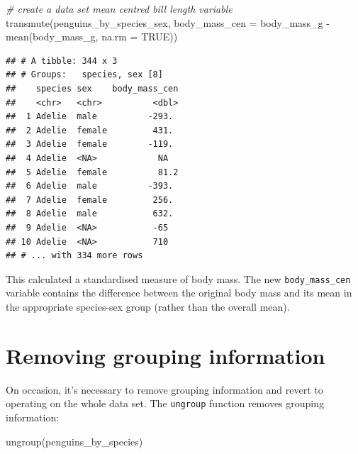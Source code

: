 \documentclass[
]{book}
\newenvironment{Shaded}{\begin{snugshade}}{\end{snugshade}}
\newcommand{\AttributeTok}[1]{\textcolor[rgb]{0.77,0.63,0.00}{#1}}
\newcommand{\CommentTok}[1]{\textcolor[rgb]{0.56,0.35,0.01}{\textit{#1}}}
\newcommand{\ConstantTok}[1]{\textcolor[rgb]{0.00,0.00,0.00}{#1}}
\newcommand{\FunctionTok}[1]{\textcolor[rgb]{0.00,0.00,0.00}{#1}}
\newcommand{\NormalTok}[1]{#1}
\newcommand{\SpecialCharTok}[1]{\textcolor[rgb]{0.00,0.00,0.00}{#1}}
\begin{document}
\begin{Shaded}
\begin{Highlighting}[]
\CommentTok{\# create a data set \textquotesingle{}mean centred\textquotesingle{} bill length variable}
\FunctionTok{transmute}\NormalTok{(penguins\_by\_species\_sex,}
          \AttributeTok{body\_mass\_cen =}\NormalTok{ body\_mass\_g }\SpecialCharTok{{-}} \FunctionTok{mean}\NormalTok{(body\_mass\_g, }\AttributeTok{na.rm =} \ConstantTok{TRUE}\NormalTok{))}
\end{Highlighting}
\end{Shaded}

\begin{verbatim}
## # A tibble: 344 x 3
## # Groups:   species, sex [8]
##    species sex    body_mass_cen
##    <chr>   <chr>          <dbl>
##  1 Adelie  male          -293. 
##  2 Adelie  female         431. 
##  3 Adelie  female        -119. 
##  4 Adelie  <NA>            NA  
##  5 Adelie  female          81.2
##  6 Adelie  male          -393. 
##  7 Adelie  female         256. 
##  8 Adelie  male           632. 
##  9 Adelie  <NA>           -65  
## 10 Adelie  <NA>           710  
## # ... with 334 more rows
\end{verbatim}

This calculated a standardised measure of body mass. The new \texttt{body\_mass\_cen} variable contains the difference between the original body mass and its mean in the appropriate species-sex group (rather than the overall mean).

\hypertarget{removing-grouping-information}{%
\section{Removing grouping information}\label{removing-grouping-information}}

On occasion, it's necessary to remove grouping information and revert to operating on the whole data set. The \texttt{ungroup} function removes grouping information:

\begin{Shaded}
\begin{Highlighting}[]
\FunctionTok{ungroup}\NormalTok{(penguins\_by\_species)}
\end{Highlighting}
\end{Shaded}
\end{document}
